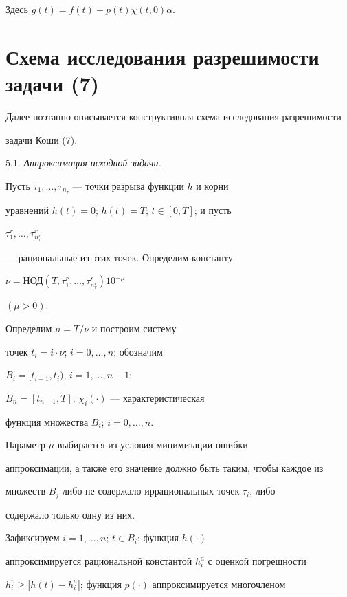 %


Здесь $g(t) = f(t) - p(t) \chi (t,0) \alpha$.





\section{Схема исследования разрешимости задачи (7)}





Далее поэтапно описывается конструктивная схема исследования разрешимости


задачи Коши (7).





5.1. {\it Аппроксимация исходной задачи.}


Пусть $\tau_1, \dotsc, \tau_{n_\tau}$ --- точки разрыва функции $h$ и корни


уравнений $h(t)=0$; $h(t)=T$; $t \in [0,T]$; и пусть


$\tau_1^r, \dotsc,\tau_{n_\tau^r}^r$


--- рациональные из этих точек. Определим константу


$\nu=\text{НОД}( T, \tau_1^r, \dotsc, \tau_{n_\tau^r}^r)10^{-\mu}$


$(\mu > 0)$.


Определим $n=T/{\nu}$ и построим систему


точек $t_i = i \cdot \nu$; $i=0, \dotsc, n $; обозначим


$B_i=[t_{i-1}, t_i)$, $i=1,\dotsc, n-1$; 


$B_{n}=[t_{n-1},T]$; $\chi_i(\cdot)$ --- характеристическая


функция множества $B_i$; $i=0, \dotsc, n$.


Параметр $\mu$ выбирается из условия минимизации ошибки


аппроксимации, а также его значение должно быть таким, чтобы каждое из


множеств $B_j$ либо не содержало иррациональных точек $\tau_i$, либо


содержало только одну из них.





Зафиксируем $i=1,\dotsc, n$; $t \in B_i$; функция $h(\cdot)$


аппроксимируется рациональной константой $h_i^a$ с оценкой погрешности


$h_i^v \ge |h(t)-h_i^a|$; функция $p(\cdot)$ аппроксимируется многочленом


